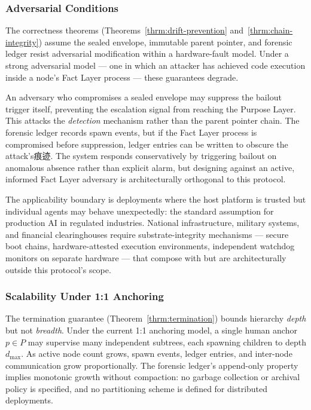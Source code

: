 \subsubsection{Adversarial Conditions}
\label{sec:lim-adversarial}

The correctness theorems (Theorems~\ref{thrm:drift-prevention} and~\ref{thrm:chain-integrity}) assume the sealed envelope, immutable parent pointer, and forensic ledger resist adversarial modification within a hardware-fault model. Under a strong adversarial model --- one in which an attacker has achieved code execution inside a node's Fact Layer process --- these guarantees degrade.

An adversary who compromises a sealed envelope may suppress the bailout trigger itself, preventing the escalation signal from reaching the Purpose Layer. This attacks the \emph{detection} mechanism rather than the parent pointer chain. The forensic ledger records spawn events, but if the Fact Layer process is compromised before suppression, ledger entries can be written to obscure the attack's痕迹. The system responds conservatively by triggering bailout on anomalous absence rather than explicit alarm, but designing against an active, informed Fact Layer adversary is architecturally orthogonal to this protocol.

The applicability boundary is deployments where the host platform is trusted but individual agents may behave unexpectedly: the standard assumption for production AI in regulated industries. National infrastructure, military systems, and financial clearinghouses require substrate-integrity mechanisms --- secure boot chains, hardware-attested execution environments, independent watchdog monitors on separate hardware --- that compose with but are architecturally outside this protocol's scope.

\subsubsection{Scalability Under 1:1 Anchoring}
\label{sec:lim-scalability}

The termination guarantee (Theorem~\ref{thrm:termination}) bounds hierarchy \emph{depth} but not \emph{breadth}. Under the current 1:1 anchoring model, a single human anchor $p \in P$ may supervise many independent subtrees, each spawning children to depth $d_{\max}$. As active node count grows, spawn events, ledger entries, and inter-node communication grow proportionally. The forensic ledger's append-only property implies monotonic growth without compaction: no garbage collection or archival policy is specified, and no partitioning scheme is defined for distributed deployments.

